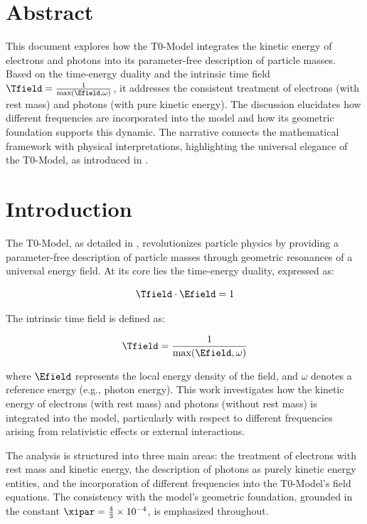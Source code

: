 \section*{Abstract}
This document explores how the T0-Model integrates the kinetic energy of electrons and photons into its parameter-free description of particle masses. Based on the time-energy duality and the intrinsic time field \( \Tfield = \frac{1}{\max(\Efield, \omega)} \), it addresses the consistent treatment of electrons (with rest mass) and photons (with pure kinetic energy). The discussion elucidates how different frequencies are incorporated into the model and how its geometric foundation supports this dynamic. The narrative connects the mathematical framework with physical interpretations, highlighting the universal elegance of the T0-Model, as introduced in \cite{pascher_t0_energy_2025}.

\section{Introduction}
\label{sec:introduction}

The T0-Model, as detailed in \cite{pascher_t0_energy_2025}, revolutionizes particle physics by providing a parameter-free description of particle masses through geometric resonances of a universal energy field. At its core lies the time-energy duality, expressed as:

\begin{equation}
	\Tfield \cdot \Efield = 1
	\label{eq:time_energy_duality}
\end{equation}

The intrinsic time field is defined as:

\begin{equation}
	\Tfield = \frac{1}{\max(\Efield, \omega)}
	\label{eq:intrinsic_time_field}
\end{equation}

where \( \Efield \) represents the local energy density of the field, and \(\omega\) denotes a reference energy (e.g., photon energy). This work investigates how the kinetic energy of electrons (with rest mass) and photons (without rest mass) is integrated into the model, particularly with respect to different frequencies arising from relativistic effects or external interactions.

The analysis is structured into three main areas: the treatment of electrons with rest mass and kinetic energy, the description of photons as purely kinetic energy entities, and the incorporation of different frequencies into the T0-Model's field equations. The consistency with the model's geometric foundation, grounded in the constant \(\xipar = \frac{4}{3} \times 10^{-4}\), is emphasized throughout.

